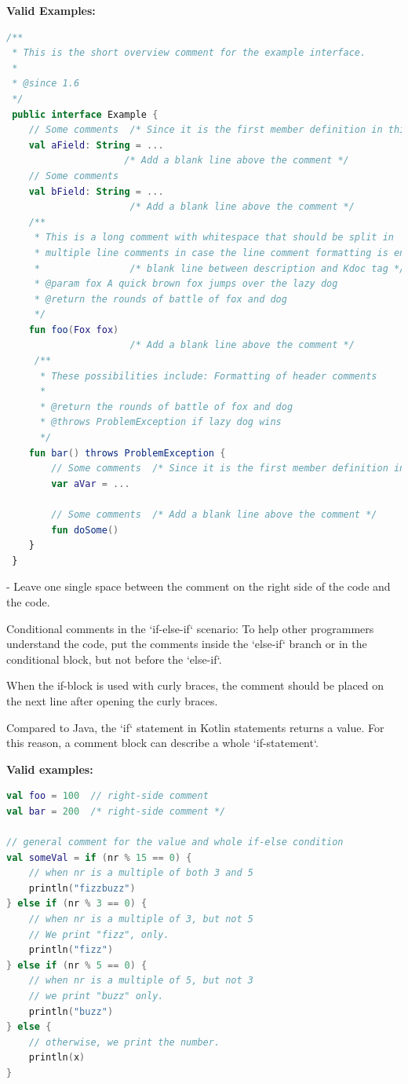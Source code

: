 \textbf{Valid Examples:}

\begin{lstlisting}[language=Kotlin]
/** 
 * This is the short overview comment for the example interface.
 * 
 * @since 1.6
 */
 public interface Example {
    // Some comments  /* Since it is the first member definition in this code block, there is no need to add a blank line here */
    val aField: String = ...
                     /* Add a blank line above the comment */
    // Some comments
    val bField: String = ...
                      /* Add a blank line above the comment */
    /**
     * This is a long comment with whitespace that should be split in 
     * multiple line comments in case the line comment formatting is enabled.
     *                /* blank line between description and Kdoc tag */
     * @param fox A quick brown fox jumps over the lazy dog
     * @return the rounds of battle of fox and dog 
     */
    fun foo(Fox fox)
                      /* Add a blank line above the comment */
     /**
      * These possibilities include: Formatting of header comments
      * 
      * @return the rounds of battle of fox and dog
      * @throws ProblemException if lazy dog wins
      */
    fun bar() throws ProblemException {
        // Some comments  /* Since it is the first member definition in this range, there is no need to add a blank line here */
        var aVar = ...

        // Some comments  /* Add a blank line above the comment */            
        fun doSome()
    }
 }
\end{lstlisting}


- Leave one single space between the comment on the right side of the code and the code. 

Conditional comments in the `if-else-if` scenario: To help other programmers understand the code, put the comments inside the `else-if` branch or in the conditional block, but not before the `else-if`.

When the if-block is used with curly braces, the comment should be placed on the next line after opening the curly braces.

Compared to Java, the `if` statement in Kotlin statements returns a value. For this reason, a comment block can describe a whole `if-statement`.



\textbf{Valid examples:}



\begin{lstlisting}[language=Kotlin]
val foo = 100  // right-side comment
val bar = 200  /* right-side comment */

// general comment for the value and whole if-else condition
val someVal = if (nr % 15 == 0) {
    // when nr is a multiple of both 3 and 5
    println("fizzbuzz")
} else if (nr % 3 == 0) {
    // when nr is a multiple of 3, but not 5
    // We print "fizz", only.
    println("fizz")
} else if (nr % 5 == 0) {
    // when nr is a multiple of 5, but not 3
    // we print "buzz" only.
    println("buzz")
} else {
    // otherwise, we print the number.
    println(x)
}
\end{lstlisting}


